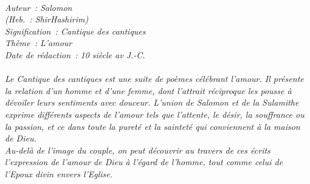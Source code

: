\BFont
\noindent\hrulefill
{\footnotesize
\textit{
\bigskip
{\centering{}
\\Auteur~: Salomon
\\(Heb.~: ShirHashirim)
\\Signification~: Cantique des cantiques
\\Thème~: L'amour
\\Date de rédaction~: 10 siècle av J.-C.\\}
}
\textit{
\\Le Cantique des cantiques est une suite de poèmes célébrant l'amour. Il présente la relation d'un homme et d'une femme, dont l'attrait réciproque les pousse à dévoiler leurs sentiments avec douceur. L'union de Salomon et de la Sulamithe exprime différents aspects de l'amour tels que l'attente, le désir, la souffrance ou la passion, et ce dans toute la pureté et la sainteté qui conviennent à la maison de Dieu.
\\Au-delà de l'image du couple, on peut découvrir au travers de ces écrits l'expression de l'amour de Dieu à l'égard de l'homme, tout comme celui de l'Epoux divin envers l'Eglise.\bigskip
}
}
\par\nobreak\noindent\hrulefill
